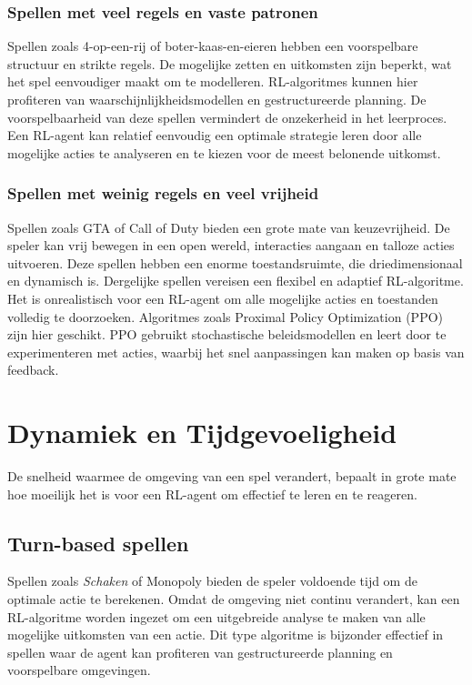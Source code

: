 \documentclass[a4paper,12pt]{report}
\begin{document}
\subsubsection{Spellen met veel regels en vaste patronen}
Spellen zoals 4-op-een-rij of boter-kaas-en-eieren hebben een voorspelbare
structuur en strikte regels. De mogelijke zetten en uitkomsten zijn beperkt,
wat het spel eenvoudiger maakt om te modelleren. RL-algoritmes kunnen hier
profiteren van waarschijnlijkheidsmodellen en gestructureerde planning. De
voorspelbaarheid van deze spellen vermindert de onzekerheid in het leerproces.
Een RL-agent kan relatief eenvoudig een optimale strategie leren door alle
mogelijke acties te analyseren en te kiezen voor de meest belonende uitkomst.

\subsubsection{Spellen met weinig regels en veel vrijheid}
Spellen zoals GTA of Call of Duty bieden een grote mate van keuzevrijheid. De
speler kan vrij bewegen in een open wereld, interacties aangaan en talloze
acties uitvoeren. Deze spellen hebben een enorme toestandsruimte, die
driedimensionaal en dynamisch is. Dergelijke spellen vereisen een flexibel en
adaptief RL-algoritme. Het is onrealistisch voor een RL-agent om alle mogelijke
acties en toestanden volledig te doorzoeken. Algoritmes zoals Proximal Policy
Optimization (PPO) zijn hier geschikt. PPO gebruikt stochastische
beleidsmodellen en leert door te experimenteren met acties, waarbij het snel
aanpassingen kan maken op basis van feedback.

\section{Dynamiek en Tijdgevoeligheid}
De snelheid waarmee de omgeving van een spel verandert, bepaalt in grote mate
hoe moeilijk het is voor een RL-agent om effectief te leren en te reageren.

\subsection{Turn-based spellen}
Spellen zoals \textit{Schaken} of Monopoly bieden de speler voldoende tijd om
de optimale actie te berekenen. Omdat de omgeving niet continu verandert, kan
een RL-algoritme worden ingezet om een uitgebreide analyse te maken van alle
mogelijke uitkomsten van een actie. Dit type algoritme is bijzonder effectief
in spellen waar de agent kan profiteren van gestructureerde planning en
voorspelbare omgevingen.
\end{document}
